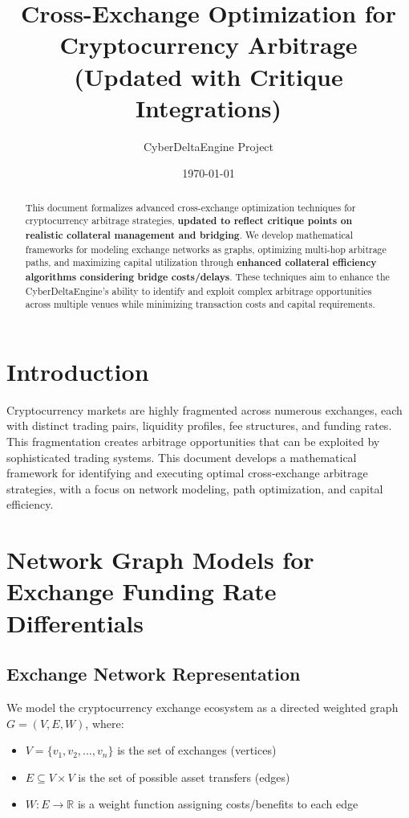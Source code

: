 \documentclass{article}
\title{Cross-Exchange Optimization for Cryptocurrency Arbitrage \\ \Large{(Updated with Critique Integrations)}}
\author{CyberDeltaEngine Project}
\date{\today}
\begin{document}
\maketitle

\begin{abstract}
This document formalizes advanced cross-exchange optimization techniques for cryptocurrency arbitrage strategies, \textbf{updated to reflect critique points on realistic collateral management and bridging}. We develop mathematical frameworks for modeling exchange networks as graphs, optimizing multi-hop arbitrage paths, and maximizing capital utilization through \textbf{enhanced collateral efficiency algorithms considering bridge costs/delays}. These techniques aim to enhance the CyberDeltaEngine's ability to identify and exploit complex arbitrage opportunities across multiple venues while minimizing transaction costs and capital requirements.
\end{abstract}

\section{Introduction}

Cryptocurrency markets are highly fragmented across numerous exchanges, each with distinct trading pairs, liquidity profiles, fee structures, and funding rates. This fragmentation creates arbitrage opportunities that can be exploited by sophisticated trading systems. This document develops a mathematical framework for identifying and executing optimal cross-exchange arbitrage strategies, with a focus on network modeling, path optimization, and capital efficiency.

\section{Network Graph Models for Exchange Funding Rate Differentials}

\subsection{Exchange Network Representation}

We model the cryptocurrency exchange ecosystem as a directed weighted graph $G = (V, E, W)$, where:
\begin{itemize}
    \item $V = \{v_1, v_2, \ldots, v_n\}$ is the set of exchanges (vertices)
    \item $E \subseteq V \times V$ is the set of possible asset transfers (edges)
    \item $W: E \rightarrow \mathbb{R}$ is a weight function assigning costs/benefits to each edge
\end{itemize}
\end{document}
